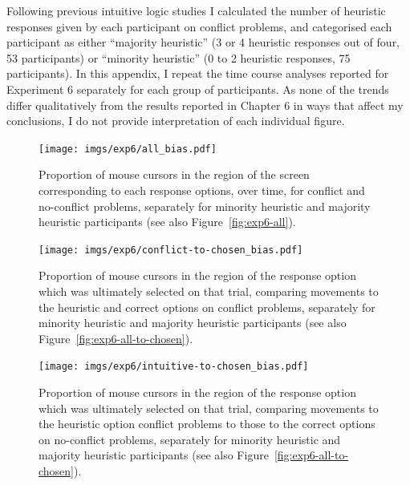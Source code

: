
Following previous intuitive logic studies \citep[e.g.][]{Mevel2014}
I calculated the number of heuristic responses given
by each participant on conflict problems, 
and categorised each participant as either
``majority heuristic'' (3 or 4 heuristic responses out of four, 53 participants)
or ``minority heuristic'' (0 to 2 heuristic responses, 75 participants).
In this appendix, I repeat the time course analyses
reported for Experiment 6 separately for each group of participants.
As none of the trends differ qualitatively from the results
reported in Chapter 6 in ways that affect my conclusions,
I do not provide interpretation of each individual figure.


\begin{figure}[h]
  \centering
  \texttt{[image: imgs/exp6/all\_bias.pdf]}
  \caption[]{
    Proportion of mouse cursors in the region of the screen 
    corresponding to each response options, over time, 
    for conflict and no-conflict problems,
    separately for minority heuristic and majority heuristic participants
    (see also Figure~\ref{fig:exp6-all}).
  }
\end{figure}

\begin{figure}[h]
  \centering
  \texttt{[image: imgs/exp6/conflict-to-chosen\_bias.pdf]}
  \caption[]{
    Proportion of mouse cursors in the region of
    the response option which was ultimately selected on that trial,
    comparing movements to the heuristic and correct options on conflict problems,
    separately for minority heuristic and majority heuristic participants
    (see also Figure~\ref{fig:exp6-all-to-chosen}).
  }
\end{figure}

\begin{figure}[h]
  \centering
  \texttt{[image: imgs/exp6/intuitive-to-chosen\_bias.pdf]}
  \caption[]{
    Proportion of mouse cursors in the region of
    the response option which was ultimately selected on that trial,
    comparing movements to the heuristic option conflict problems
    to those to the correct options on no-conflict problems,
    separately for minority heuristic and majority heuristic participants
    (see also Figure~\ref{fig:exp6-all-to-chosen}).
  }
\end{figure}


